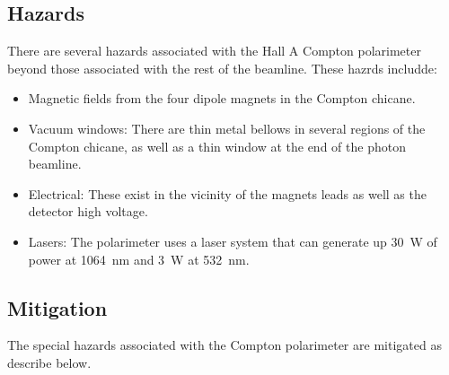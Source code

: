 \begin{safetyen}{0}{0}

\subsection{Hazards}
There are several hazards associated with the Hall A Compton polarimeter beyond those associated with the rest of the beamline. These hazrds includde:

\begin{itemize}
\item{Magnetic fields from the four dipole magnets in the Compton chicane.}
\item{Vacuum windows: There are thin metal bellows in several regions of the Compton chicane, as well as a thin window at the end of the photon beamline.}
\item{Electrical: These exist in the vicinity of the magnets leads as well as the detector high voltage.}
\item{Lasers: The polarimeter uses a laser system that can generate up 30~W of power at 1064~nm and 3~W at 532~nm.}
\end{itemize}

\subsection{Mitigation}
The special hazards associated with the Compton polarimeter are mitigated as describe below.


\end{safetyen}
